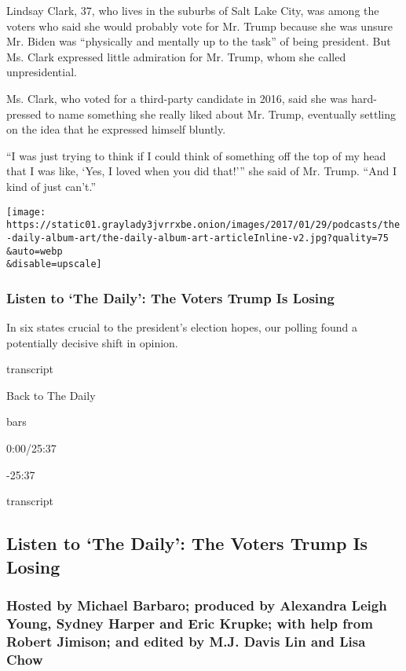 Lindsay Clark, 37, who lives in the suburbs of Salt Lake City, was among
the voters who said she would probably vote for Mr. Trump because she
was unsure Mr. Biden was ``physically and mentally up to the task'' of
being president. But Ms. Clark expressed little admiration for Mr.
Trump, whom she called unpresidential.

Ms. Clark, who voted for a third-party candidate in 2016, said she was
hard-pressed to name something she really liked about Mr. Trump,
eventually settling on the idea that he expressed himself bluntly.

``I was just trying to think if I could think of something off the top
of my head that I was like, `Yes, I loved when you did that!''' she said
of Mr. Trump. ``And I kind of just can't.''

\texttt{[image: https://static01.graylady3jvrrxbe.onion/images/2017/01/29/podcasts/the-daily-album-art/the-daily-album-art-articleInline-v2.jpg?quality=75\\\&auto=webp\\\&disable=upscale]}

\hypertarget{listen-to-the-daily-the-voters-trump-is-losing}{%
\subsubsection{Listen to `The Daily': The Voters Trump Is
Losing}\label{listen-to-the-daily-the-voters-trump-is-losing}}

In six states crucial to the president's election hopes, our polling
found a potentially decisive shift in opinion.

transcript

Back to The Daily

bars

0:00/25:37

-25:37

transcript

\hypertarget{listen-to-the-daily-the-voters-trump-is-losing-1}{%
\subsection{Listen to `The Daily': The Voters Trump Is
Losing}\label{listen-to-the-daily-the-voters-trump-is-losing-1}}

\hypertarget{hosted-by-michael-barbaro-produced-by-alexandra-leigh-young-sydney-harper-and-eric-krupke-with-help-from-robert-jimison-and-edited-by-mj-davis-lin-and-lisa-chow}{%
\subsubsection{Hosted by Michael Barbaro; produced by Alexandra Leigh
Young, Sydney Harper and Eric Krupke; with help from Robert Jimison; and
edited by M.J. Davis Lin and Lisa
Chow}\label{hosted-by-michael-barbaro-produced-by-alexandra-leigh-young-sydney-harper-and-eric-krupke-with-help-from-robert-jimison-and-edited-by-mj-davis-lin-and-lisa-chow}}

